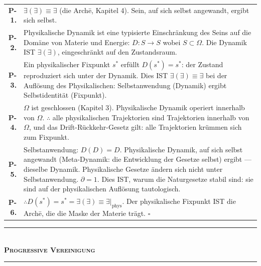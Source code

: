 \documentclass[10pt, openany, oneside]{book}
\renewcommand{\normalsize}{\fontsize{10}{13}\selectfont}
\renewcommand{\footnotesize}{\fontsize{8.5}{11}\selectfont}
\begin{document}
{\footnotesize
\noindent\begin{tabular}{r p{}}
\textbf{P-1.} & $\exists(\exists) \equiv \exists$ (die Arch\={e}, Kapitel 4). Sein, auf sich selbst angewandt, ergibt sich selbst. \\[0.3em]
\textbf{P-2.} & Physikalische Dynamik ist eine typisierte Einschränkung des Seins auf die Domäne von Materie und Energie: $D: S \to S$ wobei $S \subset \Omega$. Die Dynamik IST $\exists(\exists)$, eingeschränkt auf den Zustandsraum. \\[0.3em]
\textbf{P-3.} & Ein physikalischer Fixpunkt $s^*$ erfüllt $D(s^*) = s^*$: der Zustand reproduziert sich unter der Dynamik. Dies IST $\exists(\exists) \equiv \exists$ bei der Auflösung des Physikalischen: Selbstanwendung (Dynamik) ergibt Selbstidentität (Fixpunkt). \\[0.3em]
\textbf{P-4.} & $\Omega$ ist geschlossen (Kapitel 3). Physikalische Dynamik operiert innerhalb von $\Omega$. $\therefore$ alle physikalischen Trajektorien sind Trajektorien innerhalb von $\Omega$, und das Drift-Rückkehr-Gesetz gilt: alle Trajektorien krümmen sich zum Fixpunkt. \\[0.3em]
\textbf{P-5.} & Selbstanwendung: $D(D) = D$. Physikalische Dynamik, auf sich selbst angewandt (Meta-Dynamik: die Entwicklung der Gesetze selbst) ergibt --- dieselbe Dynamik. Physikalische Gesetze ändern sich nicht unter Selbstanwendung. $\partial = 1$. Dies IST, warum die Naturgesetze stabil sind: sie sind auf der physikalischen Auflösung tautologisch. \\[0.3em]
\textbf{P-6.} & $\therefore D(s^*) = s^* = \exists(\exists) \equiv \exists|_{\text{phys}}$. Der physikalische Fixpunkt IST die Arch\={e}, die die Maske der Materie trägt. $\square$ \\[0.3em]
\end{tabular}
}

\vspace{1.5em}


\begin{center}
    \rule{0.3\textwidth}{0.4pt}\\[0.5em]
    {\normalsize\bfseries\scshape Progressive Vereinigung}\\[0.3em]
    \rule{0.3\textwidth}{0.4pt}
\end{center}

\vspace{1em}
\end{document}
